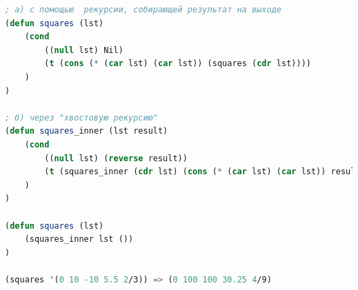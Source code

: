 \documentclass[12pt]{report}
\begin{document}
\begin{lstlisting}[language=Lisp]
; а) с помощью  рекурсии, собирающей результат на выходе
(defun squares (lst)
	(cond 
		((null lst) Nil)
		(t (cons (* (car lst) (car lst)) (squares (cdr lst))))
	)
)	

; б) через "хвостовую рекурсию" 
(defun squares_inner (lst result)
	(cond 
		((null lst) (reverse result))
		(t (squares_inner (cdr lst) (cons (* (car lst) (car lst)) result)))
	)
)

(defun squares (lst) 
	(squares_inner lst ())
)

(squares '(0 10 -10 5.5 2/3)) => (0 100 100 30.25 4/9)
\end{lstlisting}




	

	
\end{document}
